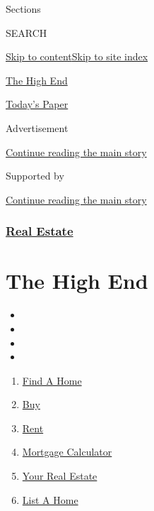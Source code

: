 Sections

SEARCH

\protect\hyperlink{site-content}{Skip to
content}\protect\hyperlink{site-index}{Skip to site index}

\href{https://www.nytimes.com/spotlight/thehighend}{The High End}

\href{https://myaccount.nytimes.com/auth/login?response_type=cookie\&client_id=vi}{}

\href{https://www.nytimes.com/section/todayspaper}{Today's Paper}

Advertisement

\protect\hyperlink{after-top}{Continue reading the main story}

Supported by

\protect\hyperlink{after-sponsor}{Continue reading the main story}

\hypertarget{real-estate}{%
\subsubsection{\texorpdfstring{\href{/section/realestate}{Real
Estate}}{Real Estate}}\label{real-estate}}

\hypertarget{the-high-end}{%
\section{The High End}\label{the-high-end}}

\begin{itemize}
\item
\item
\item
\item
\end{itemize}

\begin{enumerate}
\def\labelenumi{\arabic{enumi}.}
\tightlist
\item
  \href{/real-estate/find-a-home}{Find A Home}
\item
  \href{/real-estate/homes-for-sale}{Buy}
\item
  \href{/real-estate/homes-for-rent}{Rent}
\item
  \href{/real-estate/mortgage-calculator}{Mortgage Calculator}
\item
  \href{/real-estate/my-real-estate}{Your Real Estate}
\item
  \href{https://nytimesads.gtspayments.com/}{List A Home}
\end{enumerate}

